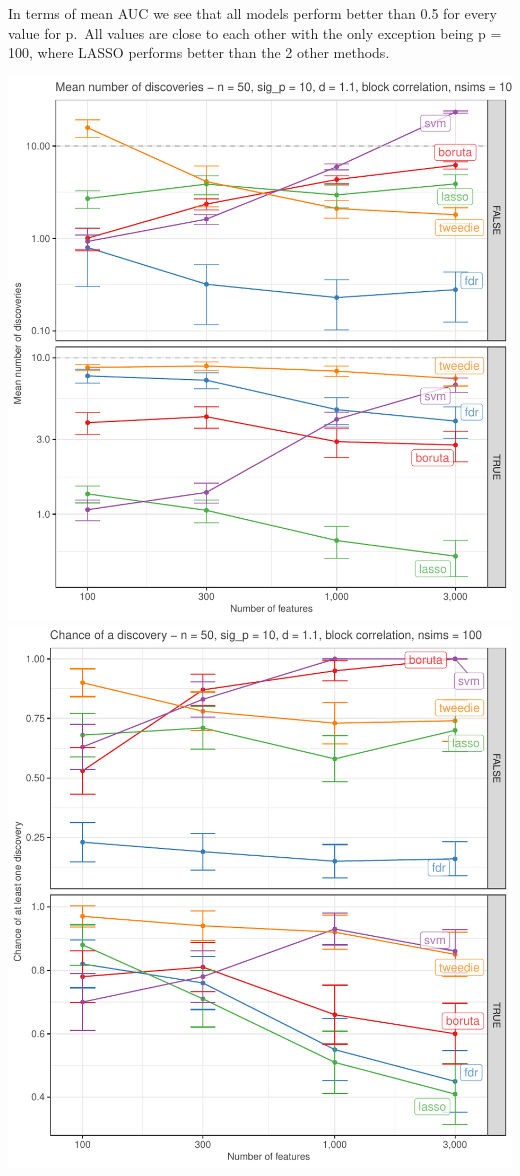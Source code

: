 \documentclass[
]{article}
\begin{document}
In terms of mean AUC we see that all models perform better than 0.5 for every value for p.~All values are close to each other with the only exception being p = 100, where LASSO performs better than the 2 other methods.

\begin{center}\includegraphics[width=0.49\linewidth]{main_files/figure-latex/unnamed-chunk-47-1} \includegraphics[width=0.49\linewidth]{main_files/figure-latex/unnamed-chunk-47-2} \end{center}
\end{document}
